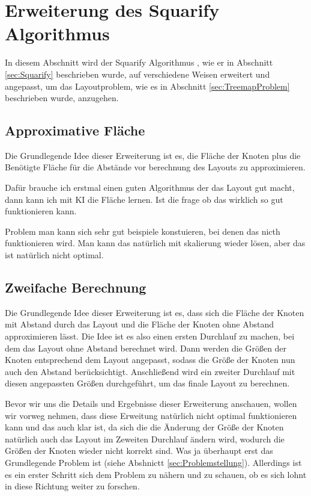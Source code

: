 \section{Erweiterung des Squarify Algorithmus} \label{sec:VerbesserungSquarify}
In diesem Abschnitt wird der Squarify Algorithmus \cite{bruls2000squarified}, wie er in Abschnitt \ref{sec:Squarify} beschrieben wurde, auf verschiedene Weisen erweitert und angepasst, um das Layoutproblem, wie es in Abschnitt \ref{sec:TreemapProblem} beschrieben wurde, anzugehen. 

\subsection{Approximative Fläche} \label{sec:ApproxFläche}
Die Grundlegende Idee dieser Erweiterung ist es, die Fläche der Knoten plus die Benötigte Fläche für die Abstände vor berechnung des Layouts zu approximieren.

Dafür brauche ich erstmal einen guten Algorithmus der das Layout gut macht, dann kann ich mit KI die Fläche lernen. Ist die frage ob das wirklich so gut funktionieren kann.

Problem man kann sich sehr gut beispiele konstuieren, bei denen das nicth funktionieren wird. Man kann das natürlich mit skalierung wieder lösen, aber das ist natürlich nicht optimal.

\subsection{Zweifache Berechnung} \label{sec:ZweifachBerechnung}


Die Grundlegende Idee dieser Erweiterung ist es, dass sich die Fläche der Knoten mit Abstand durch das Layout und die Fläche der Knoten ohne Abstand approximieren lässt. Die Idee ist es also einen ersten Durchlauf zu machen, bei dem das Layout ohne Abstand berechnet wird. Dann werden die Größen der Knoten entsprechend dem Layout angepasst, sodass die Größe der Knoten nun auch den Abstand berücksichtigt. Anschließend wird ein zweiter Durchlauf mit diesen angepassten Größen durchgeführt, um das finale Layout zu berechnen.

Bevor wir uns die Details und Ergebnisse dieser Erweiterung anschauen, wollen wir vorweg nehmen, dass diese Erweitung natürlich nicht optimal funktionieren kann und das auch klar ist, da sich die die Änderung der Größe der Knoten natürlich auch das Layout im Zeweiten Durchlauf ändern wird, wodurch die Größen der Knoten wieder nicht korrekt sind. Was ja überhaupt erst das Grundlegende Problem ist (siehe Abshnictt \ref{sec:Problemstellung}). Allerdings ist es ein erster Schritt sich dem Problem zu nähern und zu schauen, ob es sich lohnt in diese Richtung weiter zu forschen.

